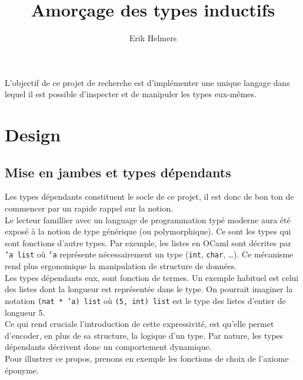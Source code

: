 \documentclass[11pt]{article}
\author{Erik Helmers}
\date{}
\title{Amorçage des types inductifs}
\begin{document}
\maketitle
\tableofcontents

\vspace{1cm}
L'objectif de ce projet de recherche est d'implémenter une unique langage dans lequel il est possible
d'inspecter et de manipuler les types eux-mêmes.

\section{Design}
\label{sec:org3679b09}

\subsection{Mise en jambes et types dépendants}
\label{sec:org1292a73}

Les types dépendants constituent le socle de ce projet, il est donc de bon ton de commencer par un rapide rappel sur la notion. \\[0pt]

Le lecteur famillier avec un language de programmation typé moderne aura été exposé à la notion de type générique (ou polymorphique). Ce sont les types qui sont fonctions d'autre types. Par exemple, les listes en OCaml sont décrites par \texttt{'a list} où \texttt{'a} représente nécessairement un type (\texttt{int}, \texttt{char}, \ldots{}). Ce mécanisme rend plus ergonomique la manipulation de structure de données. \\[0pt]

Les types dépendants eux, sont fonction de termes. Un exemple habituel est celui des listes dont la longueur est représentée dans le type. On pourrait imaginer la notation \texttt{(nat * 'a) list} où \texttt{(5, int) list} est le type des listes d'entier de longueur 5. \\[0pt]

Ce qui rend cruciale l'introduction de cette expressivité, est qu'elle permet d'encoder, en plus de sa structure, la logique d'un type. Par nature, les types dépendants décrivent donc un comportement dynamique.\\[0pt]

Pour illustrer ce propos, prenons en exemple les fonctions de choix de l'axiome éponyme.
\end{document}
